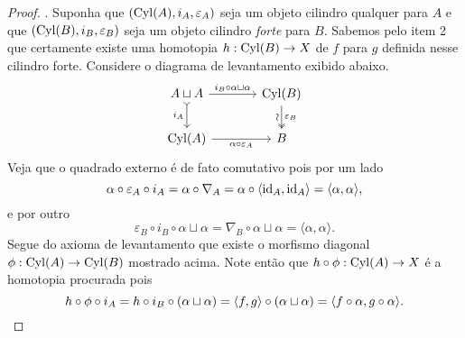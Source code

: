 \begin{proof}
  . Suponha que $(\mathrm{Cyl}(A),i_{A},\varepsilon_{A})$ seja um objeto cilindro qualquer para $A$ e que $(\mathrm{Cyl}(B),i_{B},\varepsilon_{B})$ seja um objeto cilindro \emph{forte} para $B$.
  Sabemos pelo item 2 que certamente existe uma homotopia $h: \mathrm{Cyl}(B) \to X$ de $f$ para $g$ definida nesse cilindro forte.
  Considere o diagrama de levantamento exibido abaixo.
  \begin{displaymath}
    \begin{tikzcd}[column sep=1.25cm]
      A \sqcup A
      \arrow[r, "{i_{B} \circ \alpha \sqcup \alpha}"]
      \arrow[d, tail, "i_{A}" swap]
      & \Cyl(B)
      \arrow[d, two heads, "\varepsilon_{B}", "\sim" {swap,sloped}]
      \\ \Cyl(A)
      \arrow[r, "\alpha \circ \varepsilon_{A}" swap]
      & B
    \end{tikzcd}
  \end{displaymath}
  Veja que o quadrado externo é de fato comutativo pois por um lado
  \begin{displaymath}
    \alpha \circ \varepsilon_{A} \circ i_{A} = \alpha \circ \nabla_{A} = \alpha \circ \langle \mathrm{id}_{A},\mathrm{id}_{A} \rangle = \langle \alpha,\alpha \rangle,
  \end{displaymath}
  e por outro
  \begin{displaymath}
    \varepsilon_{B} \circ i_{B} \circ \alpha \sqcup \alpha = \nabla_{B} \circ \alpha \sqcup \alpha = \langle \alpha,\alpha \rangle.
  \end{displaymath}
  Segue do axioma de levantamento que existe o morfismo diagonal $\phi: \mathrm{Cyl}(A) \to \mathrm{Cyl}(B)$ mostrado acima.
  Note então que $h \circ \phi: \mathrm{Cyl}(A) \to X$ é a homotopia procurada pois
  \begin{displaymath}
    h \circ \phi \circ i_{A} = h \circ i_{B} \circ (\alpha \sqcup \alpha) = \langle f,g \rangle \circ (\alpha \sqcup \alpha) = \langle f \circ \alpha, g \circ \alpha \rangle. \qedhere
  \end{displaymath}
\end{proof}

